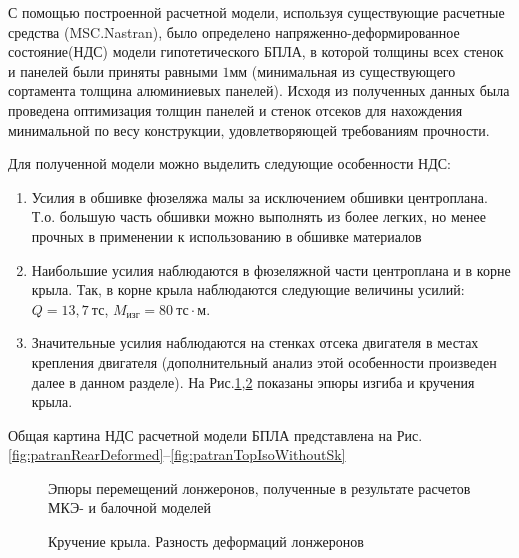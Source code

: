 \label{sec:ndsResults}

С помощью построенной расчетной модели, используя существующие расчетные средства (MSC.Nastran), было определено напряженно-деформированное состояние(НДС) модели гипотетического БПЛА, в которой толщины всех стенок и панелей были приняты равными $1\text{мм}$ (минимальная из существующего сортамента толщина алюминиевых панелей). Исходя из полученных данных была проведена оптимизация толщин панелей и стенок отсеков для нахождения минимальной по весу конструкции, удовлетворяющей требованиям прочности.

Для полученной модели можно выделить следующие особенности НДС:

\begin{enumerate}
\item Усилия в обшивке фюзеляжа малы за исключением обшивки центроплана. Т.о. большую часть обшивки можно выполнять из более легких, но менее прочных в применении к использованию в обшивке материалов
\item Наибольшие усилия наблюдаются в фюзеляжной части центроплана и в корне крыла. Так, в корне крыла наблюдаются следующие величины усилий: $Q = 13,7~\text{тс}$, $M_\text{изг} = 80~\text{тс}\cdot\text{м}$. 
\item Значительные усилия наблюдаются на стенках отсека двигателя в местах крепления двигателя (дополнительный анализ этой особенности произведен далее в данном разделе). На Рис.\ref{fig:WingDeformation3},\ref{fig:WingRotating} показаны эпюры изгиба и кручения крыла. 
\end{enumerate}  

Общая картина НДС расчетной модели БПЛА представлена на Рис.\ref{fig:patranRearDeformed}--\ref{fig:patranTopIsoWithoutSk}


\begin{figure}[H]
\centering

\captionsetup{justification=centering}
\def\svgwidth{0.9\textwidth}

\caption{Эпюры перемещений лонжеронов, полученные в результате расчетов МКЭ- и балочной моделей}
\label{fig:WingDeformation3}
\end{figure}

\begin{figure}[H]
\centering
\def\svgwidth{0.9\textwidth}

\caption{Кручение крыла. Разность деформаций лонжеронов}
\label{fig:WingRotating}
\end{figure}


